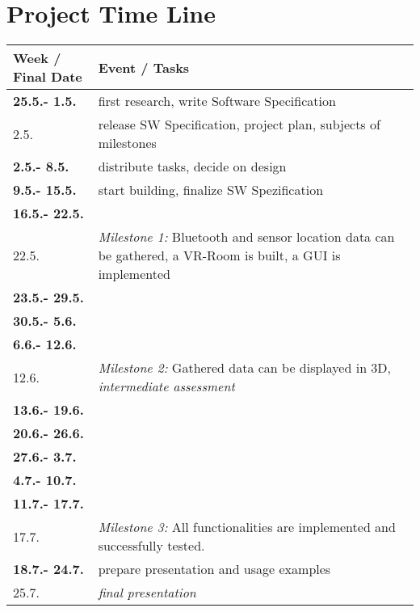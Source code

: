 \section{Project Time Line}


\begin{tabular}{l|p{12cm}}

\textbf{Week / Final Date}  & \textbf{Event / Tasks} \\ \hline

\textbf{25.5.- 1.5.} & first research, write Software Specification \\ 
2.5. & release SW Specification, project plan, subjects of milestones\\ \hline
\textbf{2.5.- 8.5.} & distribute tasks, decide on design\\ 
\textbf{9.5.- 15.5.} & start building, finalize SW Spezification \\ 
\textbf{16.5.- 22.5.} & \\
22.5. & \textit{Milestone 1:} Bluetooth and sensor location data can be gathered, a VR-Room is built, a GUI is implemented\\ \hline
\textbf{23.5.- 29.5.} &  \\
\textbf{30.5.- 5.6.} & \\
\textbf{6.6.- 12.6.} & \\
12.6. & \textit{Milestone 2:} Gathered data can be displayed in 3D, \textit{intermediate assessment} \\ \hline
\textbf{13.6.- 19.6.} & \\
\textbf{20.6.- 26.6.} & \\
\textbf{27.6.- 3.7.} & \\
\textbf{4.7.- 10.7.} & \\
\textbf{11.7.- 17.7.} & \\
17.7. & \textit{Milestone 3:} All functionalities are implemented and successfully tested. \\ \hline
\textbf{18.7.- 24.7.} & prepare presentation and usage examples\\
25.7. & \textit{final presentation }

\end{tabular} \\



